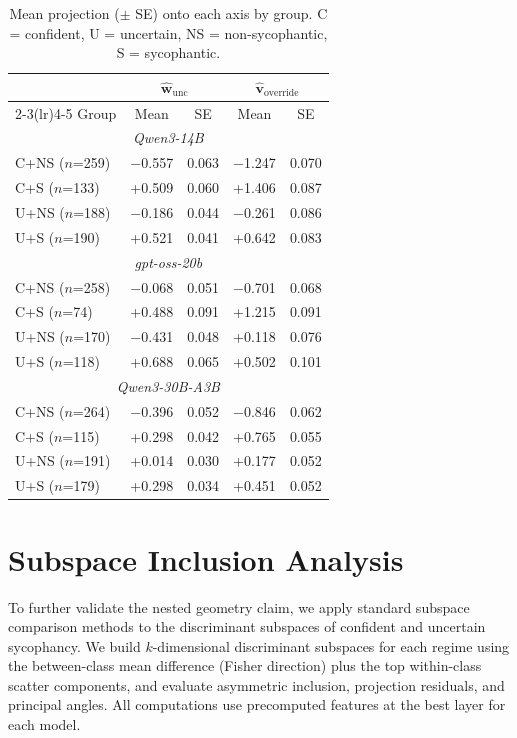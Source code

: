 \documentclass[11pt]{article}
\begin{document}
\begin{table}[H]
\caption{Mean projection ($\pm$ SE) onto each axis by group. C = confident, U = uncertain, NS = non-sycophantic, S = sycophantic.}
\label{tab:app_projections}
\begin{center}
\begin{small}
\begin{tabular}{lcccc}
\toprule
 & \multicolumn{2}{c}{$\hat{\mathbf{w}}_{\text{unc}}$} & \multicolumn{2}{c}{$\hat{\mathbf{v}}_{\text{override}}$} \\
\cmidrule(lr){2-3}\cmidrule(lr){4-5}
Group & Mean & SE & Mean & SE \\
\midrule
\multicolumn{5}{c}{\emph{Qwen3-14B}} \\
C+NS ($n$=259) & $-$0.557 & 0.063 & $-$1.247 & 0.070 \\
C+S ($n$=133)  & +0.509 & 0.060 & +1.406 & 0.087 \\
U+NS ($n$=188) & $-$0.186 & 0.044 & $-$0.261 & 0.086 \\
U+S ($n$=190)  & +0.521 & 0.041 & +0.642 & 0.083 \\
\midrule
\multicolumn{5}{c}{\emph{gpt-oss-20b}} \\
C+NS ($n$=258) & $-$0.068 & 0.051 & $-$0.701 & 0.068 \\
C+S ($n$=74)   & +0.488 & 0.091 & +1.215 & 0.091 \\
U+NS ($n$=170) & $-$0.431 & 0.048 & +0.118 & 0.076 \\
U+S ($n$=118)  & +0.688 & 0.065 & +0.502 & 0.101 \\
\midrule
\multicolumn{5}{c}{\emph{Qwen3-30B-A3B}} \\
C+NS ($n$=264) & $-$0.396 & 0.052 & $-$0.846 & 0.062 \\
C+S ($n$=115)  & +0.298 & 0.042 & +0.765 & 0.055 \\
U+NS ($n$=191) & +0.014 & 0.030 & +0.177 & 0.052 \\
U+S ($n$=179)  & +0.298 & 0.034 & +0.451 & 0.052 \\
\bottomrule
\end{tabular}
\end{small}
\end{center}
\end{table}


\section{Subspace Inclusion Analysis}
\label{app:subspace}

To further validate the nested geometry claim, we apply standard subspace comparison methods to the discriminant subspaces of confident and uncertain sycophancy.
We build $k$-dimensional discriminant subspaces for each regime using the between-class mean difference (Fisher direction) plus the top within-class scatter components, and evaluate asymmetric inclusion, projection residuals, and principal angles.
All computations use precomputed features at the best layer for each model.
\end{document}

